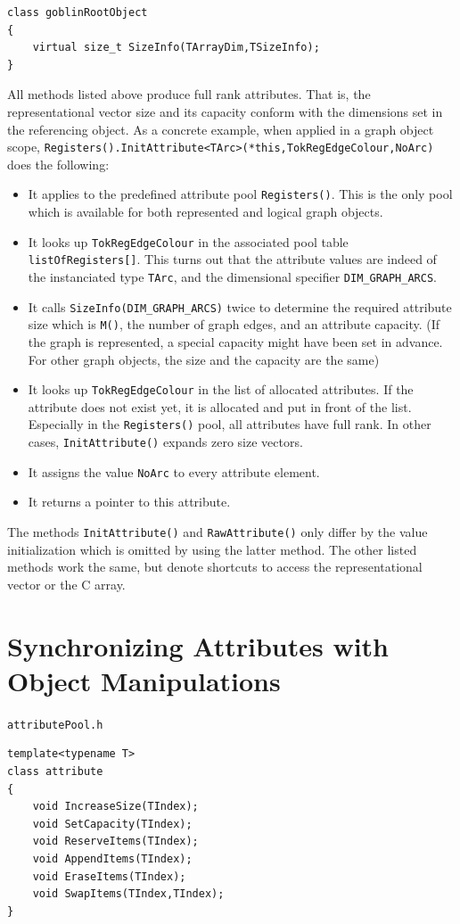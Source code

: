 \documentclass[a4paper,11pt,twoside]{book}
\begin{document}
\begin{multicols}{2}
\begin{mymethods}
\begin{verbatim}
class goblinRootObject
{
    virtual size_t SizeInfo(TArrayDim,TSizeInfo);
}
\end{verbatim}
\end{mymethods}
All methods listed above produce full rank attributes. That is, the
representational vector size and its capacity conform with the dimensions set
in the referencing object. As a concrete example, when applied in a graph object
scope, \verb/Registers().InitAttribute<TArc>(*this,TokRegEdgeColour,NoArc)/
does the following:
\begin{itemize}
\item It applies to the predefined attribute pool \verb/Registers()/. This
    is the only pool which is available for both represented and logical
    graph objects.
\item It looks up \verb/TokRegEdgeColour/ in the associated pool table
    \verb/listOfRegisters[]/. This turns out that the attribute values
    are indeed of the instanciated type \verb/TArc/, and the dimensional
    specifier \verb/DIM_GRAPH_ARCS/.
\item It calls \verb/SizeInfo(DIM_GRAPH_ARCS)/ twice to determine the
    required attribute size which is \verb/M()/, the number of graph edges,
    and an attribute capacity. (If the graph is represented, a special capacity
    might have been set in advance. For other graph objects, the size and the
    capacity are the same)
\item It looks up \verb/TokRegEdgeColour/ in the list of allocated attributes.
    If the attribute does not exist yet, it is allocated and put in front of
    the list. Especially in the \verb/Registers()/ pool, all attributes have
    full rank. In other cases, \verb/InitAttribute()/ expands zero size vectors.
\item It assigns the value \verb/NoArc/ to every attribute element.
\item It returns a pointer to this attribute.
\end{itemize}
The methods \verb/InitAttribute()/ and \verb/RawAttribute()/ only differ by
the value initialization which is omitted by using the latter method. The other
listed methods work the same, but denote shortcuts to access the representational
vector or the C array.


\section{Synchronizing Attributes with Object Manipulations}
\myinclude\verb/attributePool.h/
\begin{mymethods}
\begin{verbatim}
template<typename T>
class attribute
{
    void IncreaseSize(TIndex);
    void SetCapacity(TIndex);
    void ReserveItems(TIndex);
    void AppendItems(TIndex);
    void EraseItems(TIndex);
    void SwapItems(TIndex,TIndex);
}


\end{verbatim}
\end{mymethods}
\end{multicols}
\end{document}
